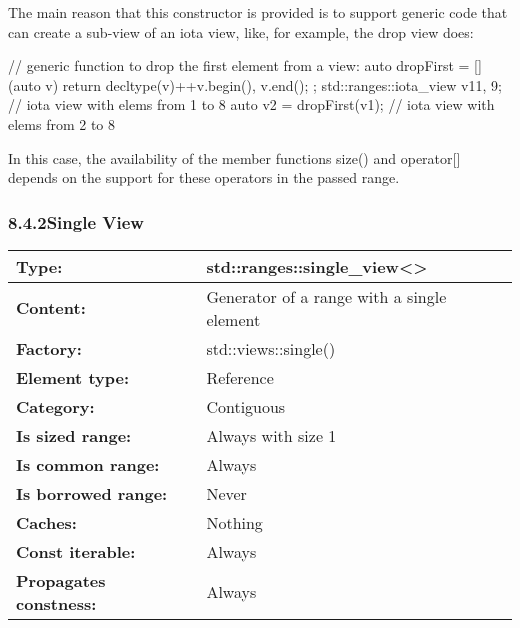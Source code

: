 The main reason that this constructor is provided is to support generic code that can create a sub-view of an iota view, like, for example, the drop view does:

\begin{cpp}
// generic function to drop the first element from a view:
auto dropFirst = [] (auto v) {
						return decltype(v){++v.begin(), v.end()};
					};
std::ranges::iota_view v1{1, 9}; // iota view with elems from 1 to 8
auto v2 = dropFirst(v1); // iota view with elems from 2 to 8
\end{cpp}

In this case, the availability of the member functions size() and operator[] depends on the support for these operators in the passed range.

\subsubsection*{ 8.4.2\hspace{0.2cm}Single View}

\begin{longtable}[c]{|l|l|}
\hline
\textbf{Type:}                 & std::ranges::single\_view\textless{}\textgreater{} \\ \hline
\endfirsthead
%
\endhead
%
\textbf{Content:}              & Generator of a range with a single element         \\ \hline
\textbf{Factory:}              & std::views::single()                               \\ \hline
\textbf{Element type:}         & Reference                                          \\ \hline
\textbf{Category:}             & Contiguous                                         \\ \hline
\textbf{Is sized range:}       & Always with size 1                                 \\ \hline
\textbf{Is common range:}      & Always                                             \\ \hline
\textbf{Is borrowed range:}    & Never                                              \\ \hline
\textbf{Caches:}               & Nothing                                            \\ \hline
\textbf{Const iterable:}       & Always                                             \\ \hline
\textbf{Propagates constness:} & Always                                             \\ \hline
\end{longtable}

